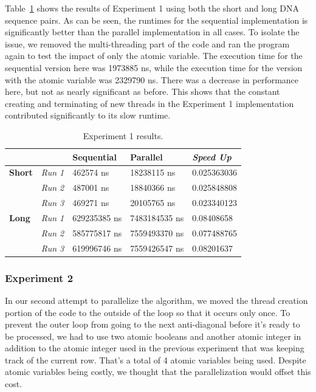 \documentclass[conference]{IEEEtran}
\begin{document}
Table~\ref{tab:table1} shows the results of Experiment 1 using both the short and long DNA sequence pairs. As can be seen, the runtimes for the sequential implementation is significantly better than the parallel implementation in all cases. To isolate the issue, we removed the multi-threading part of the code and ran the program again to test the impact of only the atomic variable. The execution time for the sequential version here was 1973885 ns, while the execution time for the version with the atomic variable was 2329790 ns. There was a decrease in performance here, but not as nearly significant as before. This shows that the constant creating and terminating of new threads in the Experiment 1 implementation contributed significantly to its slow runtime.

\begin{table}[]
\caption{Experiment 1 results.}
\label{tab:table1}
\begin{tabular}{|l|l|l|l|l|}
\hline
               & \textbf{}      & \textbf{Sequential} & \textbf{Parallel} & \textit{\textbf{Speed Up}} \\ \hline
\textbf{Short} & \textit{Run 1} & 462574 ns           & 18238115 ns       & 0.025363036                \\ \hline
               & \textit{Run 2} & 487001 ns           & 18840366 ns       & 0.025848808                \\ \hline
               & \textit{Run 3} & 469271 ns           & 20105765 ns       & 0.023340123                \\ \hline
\textbf{Long}  & \textit{Run 1} & 629235385 ns        & 7483184535 ns     & 0.08408658                 \\ \hline
               & \textit{Run 2} & 585775817 ns        & 7559493370 ns     & 0.077488765                \\ \hline
               & \textit{Run 3} & 619996746 ns        & 7559426547 ns     & 0.08201637                 \\ \hline
\end{tabular}
\end{table}

\subsubsection{Experiment 2}
In our second attempt to parallelize the algorithm, we moved the thread creation portion of the code to the outside of the loop so that it occurs only once. To prevent the outer loop from going to the next anti-diagonal before it's ready to be processed, we had to use two atomic booleans and another atomic integer in addition to the atomic integer used in the previous experiment that was keeping track of the current row. That's a total of 4 atomic variables being used. Despite atomic variables being costly, we thought that the parallelization would offset this cost.
\end{document}
